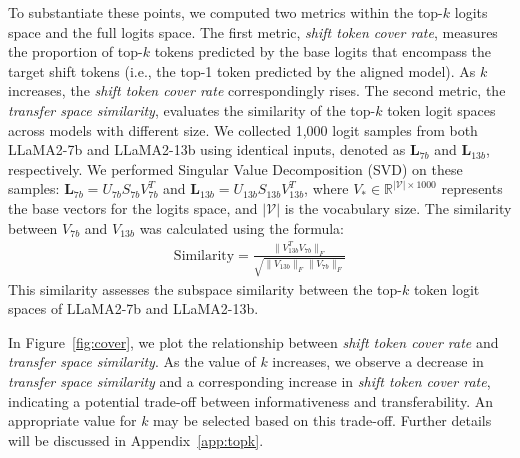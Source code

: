 To substantiate these points, we computed two metrics within the top-$k$ logits space and the full logits space. The first metric, \textit{shift token cover rate}, measures the proportion of top-$k$ tokens predicted by the base logits that encompass the target shift tokens (i.e., the top-1 token predicted by the aligned model). As $k$ increases, the \textit{shift token cover rate} correspondingly rises. The second metric, the  \textit{transfer space similarity}, evaluates the similarity of the top-$k$ token logit spaces across models with different size. We collected 1,000 logit samples from both LLaMA2-7b and LLaMA2-13b using identical inputs, denoted as $\mathbf{L}_{7b}$ and $\mathbf{L}_{13b}$, respectively. We performed Singular Value Decomposition (SVD) on these samples: $\mathbf{L}_{7b}=U_{7b}S_{7b}V_{7b}^T$ and $\mathbf{L}_{13b}=U_{13b}S_{13b}V_{13b}^T$, where $V_{*} \in \mathbb{R}^{|\mathcal{V}|\times 1000}$ represents the base vectors for the logits space, and $|\mathcal{V}|$ is the vocabulary size. The similarity between $V_{7b}$ and $V_{13b}$ was  calculated using the formula:
\begin{align}
\text{Similarity} = \frac{\|V_{13b}^T V_{7b}\|_F}{\sqrt{\|V_{13b}\|_F \|V_{7b}\|_F}}
\end{align}
This similarity assesses the subspace similarity between the top-$k$ token logit spaces of LLaMA2-7b and LLaMA2-13b.


In Figure~\ref{fig:cover}, we plot the relationship between \textit{shift token cover rate} and \textit{transfer space similarity}.   As the value of $k$ increases, we observe a decrease in \textit{transfer space similarity} and a corresponding increase in \textit{shift token cover rate}, indicating a potential trade-off between informativeness and transferability.  An appropriate value for $k$ may be selected based on this trade-off. Further details will be discussed in Appendix~\ref{app:topk}.



